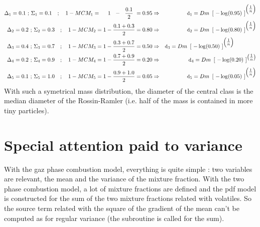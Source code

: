 \begin{eqnarray}
\Delta_{1} = 0.1 \text{ ; } \Sigma_{1} = 0.1 \quad  ; \quad 1-MCM_{1}=~~~~1~~-~~\frac{0.1}{2}~=0.95 &\Rightarrow&
           \mbox{\small d}_1 = Dm ~ \left[~ -\log(0.95) ~\right]^{\left(\textstyle \frac{1}{n}\right)} \nonumber \\
\Delta_{2} = 0.2 \text{ ; } \Sigma_{2} = 0.3 \quad  ; \quad 1-MCM_{2}=1-\frac{0.1+0.3}{2}= 0.80 &\Rightarrow& 
           \mbox{\small d}_2 = Dm ~ \left[~ -\log(0.80) ~\right]^{\left(\textstyle \frac{1}{n}\right)} \nonumber \\
\Delta_{3} = 0.4 \text{ ; } \Sigma_{3} = 0.7 \quad  ; \quad 1-MCM_{3}=1-\frac{0.3+0.7}{2}= 0.50 &\Rightarrow& 
           \mbox{\small d}_3 = Dm ~ \left[~ -\log(0.50) ~\right]^{\left(\textstyle \frac{1}{n}\right)} \qquad \qquad \\
\Delta_{4} = 0.2 \text{ ; } \Sigma_{4} = 0.9 \quad  ; \quad 1-MCM_{4}=1-\frac{0.7+0.9}{2}= 0.20 &\Rightarrow& 
           \mbox{\small d}_4 = Dm ~ \left[~ -\log(0.20) ~\right]^{\textstyle\left( \frac{1}{n}\right)} \nonumber \\
\Delta_{5} = 0.1 \text{ ; } \Sigma_{5} = 1.0 \quad  ; \quad 1-MCM_{5}=1-\frac{0.9+1.0}{2}= 0.05 &\Rightarrow& 
           \mbox{\small d}_5 = Dm ~ \left[~ -\log(0.05) ~\right]^{\left(\textstyle \frac{1}{n}\right)} \nonumber
\end{eqnarray}
With such a symetrical mass distribution, the diameter of the central class is the median diameter of the Rossin-Ramler (i.e. half of the mass is contained in more tiny particles).

\section{Special attention paid to variance}

With the gaz phase combustion model, everything is quite simple : two variables
are relevant, the mean and the variance of the mixture fraction. With the two
phase combustion model, a lot of mixture fractions are defined and the pdf model
is constructed for the sum of the two mixture fractions related with
volatiles. So the source term related with the square of the gradient of the
mean can't be computed as for regular variance (the  subroutine is
called for the sum).

